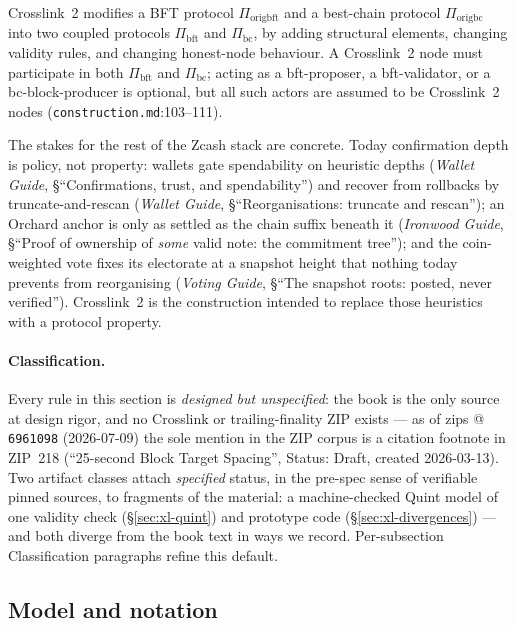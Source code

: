 \documentclass[11pt,a4paper]{article}
\theoremstyle{definition}
\begin{document}
Crosslink~2 modifies a BFT protocol $\Pi_{\mathrm{origbft}}$ and a
best-chain protocol $\Pi_{\mathrm{origbc}}$ into two coupled protocols
$\Pi_{\mathrm{bft}}$ and $\Pi_{\mathrm{bc}}$, by adding structural
elements, changing validity rules, and changing honest-node behaviour. A
Crosslink~2 node must participate in both $\Pi_{\mathrm{bft}}$ and
$\Pi_{\mathrm{bc}}$; acting as a bft-proposer, a bft-validator, or a
bc-block-producer is optional, but all such actors are assumed to be
Crosslink~2 nodes (\texttt{construction.md}:103--111).

The stakes for the rest of the Zcash stack are concrete. Today
confirmation depth is policy, not property: wallets gate spendability on
heuristic depths (\emph{Wallet Guide}, \S``Confirmations, trust, and
spendability'') and recover from rollbacks by truncate-and-rescan
(\emph{Wallet Guide}, \S``Reorganisations: truncate and rescan''); an
Orchard anchor is only as settled as the chain suffix beneath it
(\emph{Ironwood Guide}, \S``Proof of ownership of \emph{some} valid note:
the commitment tree''); and the coin-weighted vote fixes its electorate at
a snapshot height that nothing today prevents from reorganising
(\emph{Voting Guide}, \S``The snapshot roots: posted, never verified'').
Crosslink~2 is the construction intended to replace those heuristics with
a protocol property.

\paragraph{Classification.} Every rule in this section is \emph{designed
but unspecified}: the book is the only source at design rigor, and no
Crosslink or trailing-finality ZIP exists --- as of zips @
\texttt{6961098} (2026-07-09) the sole mention in the ZIP corpus is a
citation footnote in ZIP~218 (``25-second Block Target Spacing'', Status:
Draft, created 2026-03-13). Two artifact classes attach \emph{specified}
status, in the pre-spec sense of verifiable pinned sources, to fragments
of the material: a machine-checked Quint model of one validity check
(\S\ref{sec:xl-quint}) and prototype code (\S\ref{sec:xl-divergences}) ---
and both diverge from the book text in ways we record. Per-subsection
Classification paragraphs refine this default.

\subsection{Model and notation}\label{sec:xl-constr-model}
\end{document}
